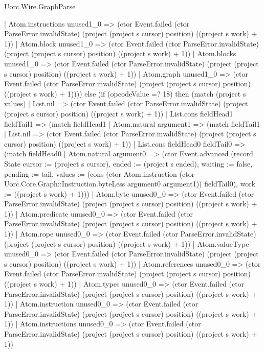 \begin{lexlean}{Uorc.Wire.GraphParse}
\begin{semanticmodule}
{          | Atom.instructions unused1_0 => (ctor Event.failed (ctor ParseError.invalidState) (project (project s cursor) position) ((project s work) + 1))
          | Atom.block unused1_0 => (ctor Event.failed (ctor ParseError.invalidState) (project (project s cursor) position) ((project s work) + 1))
          | Atom.blocks unused1_0 => (ctor Event.failed (ctor ParseError.invalidState) (project (project s cursor) position) ((project s work) + 1))
          | Atom.graph unused1_0 => (ctor Event.failed (ctor ParseError.invalidState) (project (project s cursor) position) ((project s work) + 1)))) else (if (opcodeValue =? 18) then (match (project s values)
        | List.nil => (ctor Event.failed (ctor ParseError.invalidState) (project (project s cursor) position) ((project s work) + 1))
        | List.cons fieldHead1 fieldTail1 => (match fieldHead1
          | Atom.natural argument1 => (match fieldTail1
            | List.nil => (ctor Event.failed (ctor ParseError.invalidState) (project (project s cursor) position) ((project s work) + 1))
            | List.cons fieldHead0 fieldTail0 => (match fieldHead0
              | Atom.natural argument0 => (ctor Event.advanced (record State {cursor := (project s cursor), ended := (project s ended), waiting := false, pending := tail, values := (cons (ctor Atom.instruction (ctor Uorc.Core.Graph::Instruction.byteLess argument0 argument1)) fieldTail0), work := ((project s work) + 1)}))
              | Atom.byte unused0_0 => (ctor Event.failed (ctor ParseError.invalidState) (project (project s cursor) position) ((project s work) + 1))
              | Atom.predicate unused0_0 => (ctor Event.failed (ctor ParseError.invalidState) (project (project s cursor) position) ((project s work) + 1))
              | Atom.rope unused0_0 => (ctor Event.failed (ctor ParseError.invalidState) (project (project s cursor) position) ((project s work) + 1))
              | Atom.valueType unused0_0 => (ctor Event.failed (ctor ParseError.invalidState) (project (project s cursor) position) ((project s work) + 1))
              | Atom.references unused0_0 => (ctor Event.failed (ctor ParseError.invalidState) (project (project s cursor) position) ((project s work) + 1))
              | Atom.types unused0_0 => (ctor Event.failed (ctor ParseError.invalidState) (project (project s cursor) position) ((project s work) + 1))
              | Atom.instruction unused0_0 => (ctor Event.failed (ctor ParseError.invalidState) (project (project s cursor) position) ((project s work) + 1))
              | Atom.instructions unused0_0 => (ctor Event.failed (ctor ParseError.invalidState) (project (project s cursor) position) ((project s work) + 1))
}
\end{semanticmodule}
\end{lexlean}
